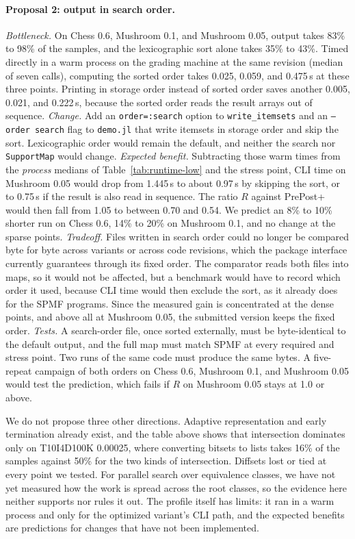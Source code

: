 \paragraph{Proposal 2: output in search order.}
\emph{Bottleneck.} On Chess 0.6, Mushroom 0.1, and Mushroom 0.05, output takes 83\% to
98\% of the samples, and the lexicographic sort alone takes 35\% to 43\%. Timed directly
in a warm process on the grading machine at the same revision (median of seven calls),
computing the sorted order takes 0.025, 0.059, and 0.475\,s at these three points.
Printing in storage order instead of sorted order saves another 0.005, 0.021, and
0.222\,s, because the sorted order reads the result arrays out of sequence.
\emph{Change.} Add an \texttt{order=:search} option to \texttt{write\_itemsets} and an
\texttt{--order search} flag to \texttt{demo.jl} that write itemsets in storage order and
skip the sort. Lexicographic order would remain the default, and neither the search nor
\texttt{SupportMap} would change. \emph{Expected benefit.} Subtracting those warm times
from the \emph{process} medians of Table~\ref{tab:runtime-low} and the stress point, CLI
time on Mushroom 0.05 would drop from 1.445\,s to about 0.97\,s by skipping the sort, or
to 0.75\,s if the result is also read in sequence. The ratio $R$ against PrePost+ would
then fall from 1.05 to between 0.70 and 0.54. We predict an 8\% to 10\% shorter run on
Chess 0.6, 14\% to 20\% on Mushroom 0.1, and no change at the sparse points.
\emph{Tradeoff.} Files written in search order could no longer be compared byte for byte
across variants or across code revisions, which the package interface currently
guarantees through its fixed order. The comparator reads both files into maps, so it
would not be affected, but a benchmark would have to record which order it used, because
CLI time would then exclude the sort, as it already does for the SPMF programs. Since the
measured gain is concentrated at the dense points, and above all at Mushroom 0.05, the
submitted version keeps the fixed order. \emph{Tests.} A search-order file, once sorted
externally, must be byte-identical to the default output, and the full map must match
SPMF at every required and stress point. Two runs of the same code must produce the same
bytes. A five-repeat campaign of both orders on Chess 0.6, Mushroom 0.1, and Mushroom 0.05
would test the prediction, which fails if $R$ on Mushroom 0.05 stays at 1.0 or above.

We do not propose three other directions. Adaptive representation and early termination
already exist, and the table above shows that intersection dominates only on T10I4D100K
0.00025, where converting bitsets to lists takes 16\% of the samples against 50\% for the
two kinds of intersection. Diffsets lost or tied at every point we tested. For parallel
search over equivalence classes, we have not yet measured how the work is spread across
the root classes, so the evidence here neither supports nor rules it out. The profile
itself has limits: it ran in a warm process and only for the optimized variant's CLI path,
and the expected benefits are predictions for changes that have not been implemented.
